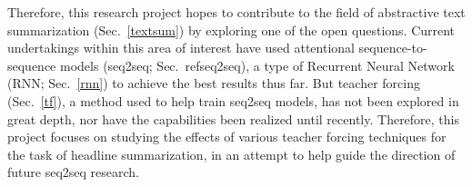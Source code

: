 Therefore, this research project hopes to contribute to the field of abstractive text summarization (Sec.~\ref{textsum}) by exploring one of the open questions. Current undertakings within this area of interest have used attentional sequence-to-sequence models (seq2seq; Sec.~ref{seq2seq}), a type of Recurrent Neural Network (RNN; Sec.~\ref{rnn}) to achieve the best results thus far. But teacher forcing (Sec.~\ref{tf}), a method used to help train seq2seq models, has not been explored in great depth, nor have the capabilities been realized until recently. Therefore, this project focuses on studying the effects of various teacher forcing techniques for the task of headline summarization, in an attempt to help guide the direction of future seq2seq research.